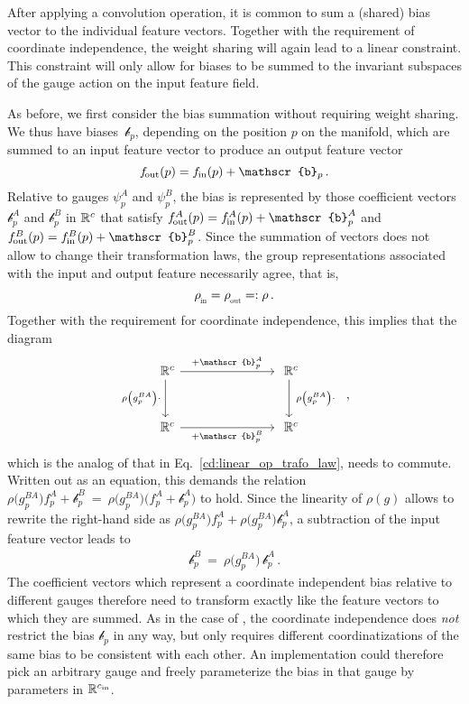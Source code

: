 After applying a convolution operation, it is common to sum a (shared) bias vector to the individual feature vectors.
Together with the requirement of coordinate independence, the weight sharing will again lead to a linear constraint.
This constraint will only allow for biases to be summed to the invariant subspaces of the gauge action on the input feature field.


As before, we first consider the bias summation without requiring weight sharing.
We thus have biases~$\mathscr{b}_p$, depending on the position $p$ on the manifold, which are summed to an input feature vector to produce an output feature vector
\begin{align}
    \fout(p) = \fin(p) + \mathscr{b}_p \,.
\end{align}
Relative to gauges $\psi_p^A$ and $\psi_p^B$, the bias is represented by those coefficient vectors $\mathscr{b}_p^A$ and $\mathscr{b}_p^B$ in $\mathbb{R}^c$ that satisfy $\fout^A(p) = \fin^A(p) + \mathscr{b}_p^A$ and $\fout^B(p) = \fin^B(p) + \mathscr{b}_p^B$.
Since the summation of vectors does not allow to change their transformation laws, the group representations associated with the input and output feature necessarily agree, that is,
\begin{align}
    \rhoin = \rhoout =: \rho \,.
\end{align}
Together with the requirement for coordinate independence, this implies that the diagram
\begin{equation}\label{eq:bias_trafo_law}
\begin{tikzcd}[column sep=75pt, row sep=30pt, font=\normalsize]
    \R^c
        \arrow[d, "\rho \big(g_p^{BA}\big)\cdot\,"']
        \arrow[r, "+\mathscr{b}_p^A"]
    &
    \R^c
        \arrow[d, "\ \rho\big( g_p^{BA}\big) \cdot"]
    \\
    \R^c
        \arrow[r, "+\mathscr{b}_p^B"']
    &
    \R^c
\end{tikzcd}
\ \ ,
\end{equation}
which is the analog of that in Eq.~\eqref{cd:linear_op_trafo_law}, needs to commute.
Written out as an equation, this demands the relation
$\rho\big(g_p^{BA}\big) f^A_p + \mathscr{b}_p^B \ =\ \rho\big(g_p^{BA}\big) \big(f^A_p + \mathscr{b}_p^A\big)$
to hold.
Since the linearity of $\rho(g)$ allows to rewrite the right-hand side as
$\rho\big(g_p^{BA}\big) f^A_p + \rho\big(g_p^{BA}\big) \mathscr{b}_p^A$,
a subtraction of the input feature vector leads to
\begin{align}\label{eq:bias_trafo_non_shared}
    \mathscr{b}_p^B\ =\ \rho\big(g_p^{BA}\big) \, \mathscr{b}_p^A \,.
\end{align}
The coefficient vectors which represent a coordinate independent bias relative to different gauges therefore need to transform exactly like the feature vectors to which they are summed.
As in the case of \onexones, the coordinate independence does \emph{not} restrict the bias $\mathscr{b}_p$ in any way, but only requires different coordinatizations of the same bias to be consistent with each other.
An implementation could therefore pick an arbitrary gauge and freely parameterize the bias in that gauge by parameters in $\mathbb{R}^{{c_\textup{in}}}$.


